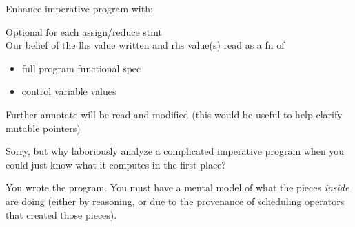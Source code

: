 \newpage
{}

{\LARGE

Enhance imperative program with:

\vfill

Optional  for each assign/reduce stmt\\
Our belief of the lhs value written and rhs value(s) read as a fn of
\begin{itemize}
\item full program functional spec
\item control variable values
\end{itemize}

\vfill

Further annotate  will be read and modified
(this would be useful to help clarify mutable pointers)


\vfill

}

\newpage
{}

{\LARGE

Sorry, but why laboriously analyze a complicated imperative program when you could just know what it computes in the first place?

\vspace{20mm}

You wrote the program.
You must have a mental model of what the pieces \emph{inside} are doing (either by reasoning, or due to the provenance of scheduling operators that created those pieces).

}

\newpage
{}

